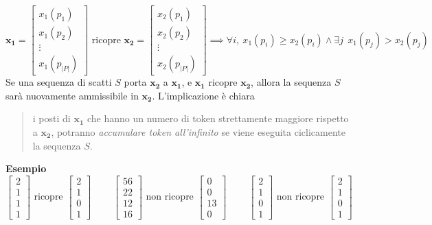 \documentclass[10pt, letterpaper]{report}
\begin{document}
$$ \mathbf{x_1}=\begin{bmatrix}
    x_1(p_1)\\ x_1(p_2)\\\vdots \\x_1(p_{|P|})
\end{bmatrix} \text{ ricopre } \mathbf{x_2}=\begin{bmatrix}
    x_2(p_1)\\ x_2(p_2)\\\vdots \\x_2(p_{|P|})
\end{bmatrix} \implies \forall i, \ x_1(p_i)\ge x_2(p_i)\land \exists j \ \ x_1(p_j)> x_2(p_j)$$
Se una sequenza di scatti $S$ porta $\mathbf{x_2}$ a $\mathbf{x_1}$, e  
$\mathbf{x_1}$ ricopre $\mathbf{x_2}$, allora la sequenza $S$ sarà nuovamente ammissibile in $\mathbf{x_2}$. L'implicazione è chiara \begin{quotation}
    i posti di $\mathbf{x_1}$ che hanno un numero di token strettamente maggiore rispetto a  $\mathbf{x_2}$, potranno \textit{accumulare token all'infinito} se viene eseguita ciclicamente la sequenza $S$.
\end{quotation}
\textbf{Esempio}
$$\begin{bmatrix}
    2 \\ 1 \\ 1 \\ 1
\end{bmatrix} \text{ ricopre } 
\begin{bmatrix}
    2 \\ 1 \\ 0 \\ 1
\end{bmatrix} \ \ \ \ \  \ \ \ \ \  
\begin{bmatrix}
    56 \\ 22 \\ 12 \\ 16
\end{bmatrix} \text{ non ricopre } 
\begin{bmatrix}
    0 \\ 0 \\ 13 \\ 0
\end{bmatrix}  \ \ \ \ \    \ \ \ \ \  
\begin{bmatrix}
    2 \\ 1 \\ 0 \\ 1
\end{bmatrix} \text{ non ricopre } 
\begin{bmatrix}
    2 \\ 1 \\ 0 \\ 1
\end{bmatrix}
$$
\end{document}

